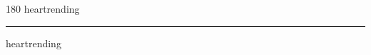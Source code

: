 
\begin{frame}
\begin{center}
\begin{turn}{180}
{\fontsize{2.5cm}{1em}\selectfont heartrending}
\end{turn}
\vspace{1em}\par  
\hrule
\vspace{1em}\par  
{\fontsize{2.5cm}{1em}\selectfont heartrending}
\end{center}
\end{frame}
